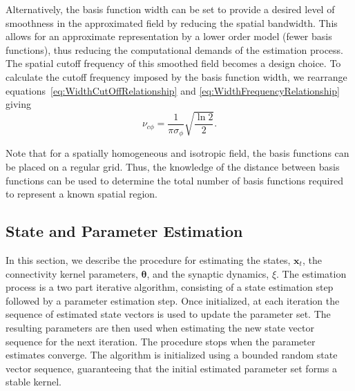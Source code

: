 \documentclass[5p,authoryear]{elsarticle}
\begin{document}
Alternatively, the basis function width can be set to provide a desired level of smoothness in the approximated field by reducing the spatial bandwidth. This allows for an approximate representation by a lower order model (fewer basis functions), thus reducing the computational demands of the estimation process. The spatial cutoff frequency of this smoothed field becomes a design choice. To calculate the cutoff frequency imposed by the basis function width, we rearrange equations~\ref{eq:WidthCutOffRelationship} and \ref{eq:WidthFrequencyRelationship} giving
\begin{equation}\label{eq:CutoffFromBasisFuncWidth}
	\nu_{c\phi}=\frac{1}{\pi\sigma_{\phi}}\sqrt{\frac{\ln2}{2}}.
\end{equation} 

Note that for a spatially homogeneous and isotropic field, the basis functions can be placed on a regular grid. Thus, the knowledge of the distance between basis functions can be used to determine the total number of basis functions required to represent a known spatial region.

\subsection{State and Parameter Estimation}\label{StateAndParameterEstimationSection} In this section, we describe the procedure for estimating the states, $\mathbf{x}_t$, the connectivity kernel parameters, $\boldsymbol \theta$, and the synaptic dynamics, $\xi$. The estimation process is a two part iterative algorithm, consisting of a state estimation step followed by a parameter estimation step. Once initialized, at each iteration the sequence of estimated state vectors is used to update the parameter set. The resulting parameters are then used when estimating the new state vector sequence for the next iteration. The procedure stops when the parameter estimates converge. The algorithm is initialized using a bounded random state vector sequence, guaranteeing that the initial estimated parameter set forms a stable kernel.
\end{document}
